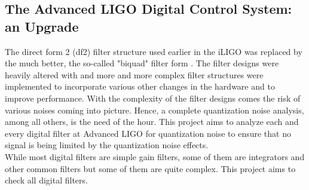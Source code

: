 \documentclass[colorlinks=true,pdfstartview=FitV,linkcolor=blue,
            citecolor=red,urlcolor=magenta]{ligodoc}
\begin{document}
	\subsection{The Advanced LIGO Digital Control System: an Upgrade} The direct form 2 (df2) filter structure used earlier in the iLIGO was replaced by the much better, the so-called "biquad" filter form \cite{matts}. The filter designs were heavily altered with and more and more complex filter structures were implemented to incorporate various other changes in the hardware and to improve performance. With the complexity of the filter designs comes the risk of various noises coming into picture. Hence, a complete quantization noise analysis, among all others, is the need of the hour. This project aims to analyze each and every digital filter at Advanced LIGO for quantization noise to ensure that no signal is being limited by the quantization noise effects.\\While most digital filters are simple gain filters, some of them are integrators and other common filters but some of them are quite complex. This project aims to check all digital filters.
\end{document}
